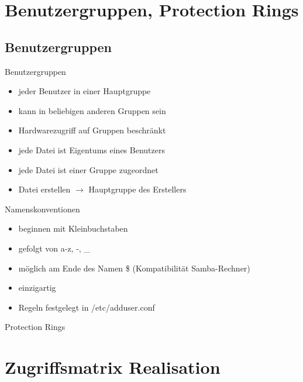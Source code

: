 \documentclass[ucs,9pt]{beamer}
\begin{document}
\section{Benutzergruppen, Protection Rings}

\subsection{Benutzergruppen}

\begin{frame}{Benutzergruppen}
\begin{itemize}
\item jeder Benutzer in einer Hauptgruppe
\item kann in beliebigen anderen Gruppen sein
\item Hardwarezugriff auf Gruppen beschränkt
\item jede Datei ist Eigentums eines Benutzers
\item jede Datei ist einer Gruppe zugeordnet
\item Datei erstellen $\rightarrow$ Hauptgruppe des Erstellers
\end{itemize}
\end{frame}

\begin{frame}{Namenskonventionen}
\begin{itemize}
\item beginnen mit Kleinbuchstaben
\item gefolgt von a-z, -, \_
\item möglich am Ende des Namen \$ (Kompatibilität Samba-Rechner)
\item einzigartig
\end{itemize}
\begin{itemize}
\item Regeln festgelegt in /etc/adduser.conf
\end{itemize}
\end{frame}

\begin{frame}{Protection Rings}

\end{frame}

\section{Zugriffsmatrix Realisation}
\end{document}
